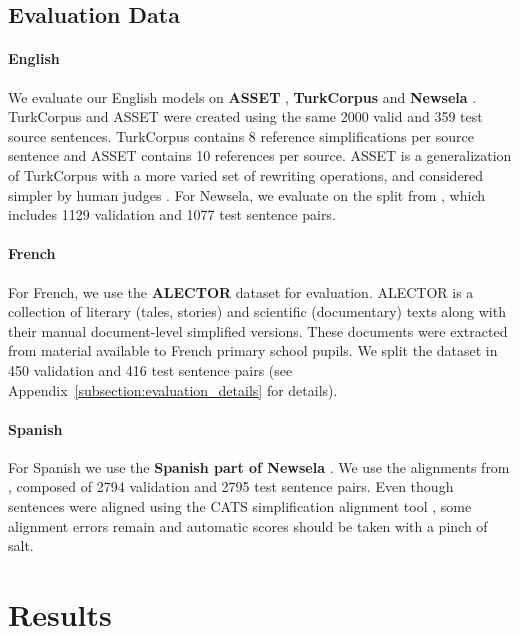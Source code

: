 \documentclass[11pt]{article}
\newcommand{\asset}{ASSET\xspace}
\newcommand{\newsela}{Newsela\xspace}
\newcommand{\alector}{ALECTOR\xspace}
\newcommand{\turkcorpus}{TurkCorpus\xspace}
\begin{document}
\subsection{Evaluation Data}\label{subsection:evaluation_data}

\paragraph{English} We evaluate our English models on \textbf{\asset} \cite{alva2020asset}, \textbf{\turkcorpus} \cite{xu2016optimizing} and \textbf{\newsela} \cite{xu2015problems}.
\turkcorpus  and \asset were created using the same 2000 valid and 359 test source sentences.
\turkcorpus contains 8 reference simplifications per source sentence and \asset contains 10 references per source.
\asset is a generalization of \turkcorpus with a more varied set of rewriting operations, and considered simpler by human judges \cite{alva2020asset}.
For \newsela, we evaluate on the split from \cite{zhang2017sentence}, which includes 1129 validation and 1077 test sentence pairs.

\paragraph{French} For French, we use the \textbf{\alector} dataset \cite{gala2020alector} for evaluation. \alector is a collection of literary (tales, stories) and scientific (documentary) texts along with their manual document-level simplified versions. These documents were extracted from material available to French primary school pupils. We split the dataset in 450 validation and 416 test sentence pairs (see Appendix~\ref{subsection:evaluation_details} for details).


\paragraph{Spanish} For Spanish we use the \textbf{Spanish part of \newsela} \cite{xu2015problems}.
We use the alignments from \cite{aprosio2019neural}, composed of 2794 validation and 2795 test sentence pairs.
Even though sentences were aligned using the \textsc{CATS} simplification alignment tool \cite{stajner-etal-2018-cats}, some alignment errors remain and automatic scores should be taken with a pinch of salt.

 \section{Results}
\end{document}
